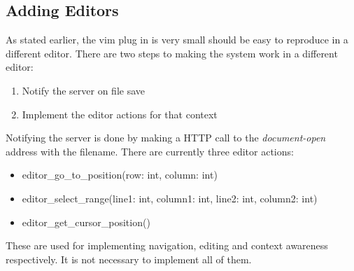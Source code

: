 \documentclass[../thesis.tex]{subfiles}
\begin{document}
\subsection{Adding Editors}%
\label{sec:adding_editors}
As stated earlier, the vim plug in is very small should be easy to reproduce in a different editor.
There are two steps to making the system work in a different editor:
\begin{enumerate}
    \item Notify the server on file save
    \item Implement the editor actions for that context
\end{enumerate}
Notifying the server is done by making a HTTP call to the \textit{document-open} address with the filename.
There are currently three editor actions:
\begin{itemize}
    \item editor\_go\_to\_position(row: int, column: int)
    \item editor\_select\_range(line1: int, column1: int, line2: int, column2: int)
    \item editor\_get\_cursor\_position()
\end{itemize}
These are used for implementing navigation, editing and context awareness respectively.
It is not necessary to implement all of them.
\end{document}
